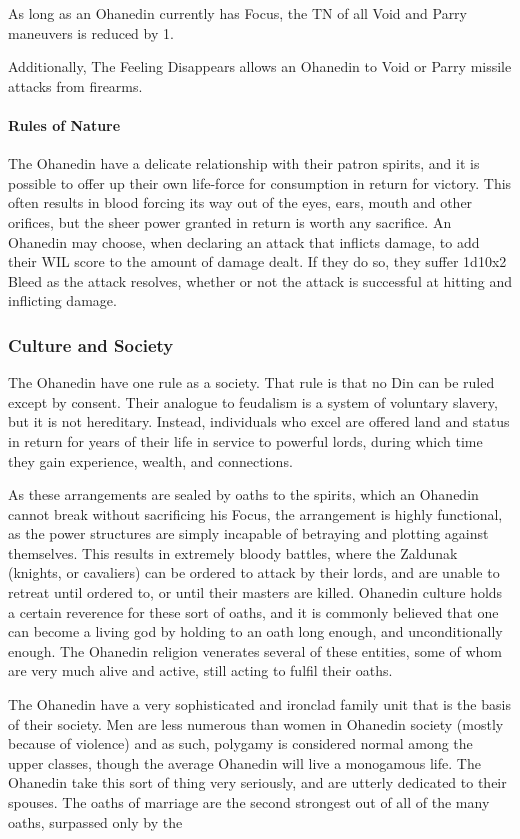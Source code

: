 \documentclass[oneside,11pt,english]{book}
\begin{document}
As long as an Ohanedin currently has Focus, the TN of all Void and Parry maneuvers is reduced by 1.

Additionally, The Feeling Disappears allows an Ohanedin to Void or Parry missile attacks from firearms. 
\paragraph{Rules of Nature}
The Ohanedin have a delicate relationship with their patron spirits, and it is possible to offer up 
their own life-force for consumption in return for victory. This often results in blood forcing its 
way out of the eyes, ears, mouth and other orifices, but the sheer power granted in return is worth 
any sacrifice. An Ohanedin may choose, when declaring an attack that inflicts damage, to add 
their WIL score to the amount of damage dealt. If they do so, they suffer 1d10x2 Bleed as the 
attack resolves, whether or not the attack is successful at hitting and inflicting damage. 
\subsubsection*{Culture and Society} 
The Ohanedin have one rule as a society. That rule is that no Din can be ruled except by consent. Their 
analogue to feudalism is a system of voluntary slavery, but it is not hereditary. Instead, individuals who 
excel are offered land and status in return for years of their life in service to powerful lords, during which 
time they gain experience, wealth, and connections. 


As these arrangements are sealed by oaths to the spirits, which an Ohanedin cannot break without 
sacrificing his Focus, the arrangement is highly functional, as the power structures are simply incapable 
of betraying and plotting against themselves. This results in extremely bloody battles, where the Zaldunak 
(knights, or cavaliers) can be ordered to attack by their lords, and are unable to retreat until ordered to, or 
until their masters are killed. Ohanedin culture holds a certain reverence for these sort of oaths, and it is 
commonly believed that one can become a living god by holding to an oath long enough, and 
unconditionally enough. The Ohanedin religion venerates several of these entities, some of whom are 
very much alive and active, still acting to fulfil their oaths. 


The Ohanedin have a very sophisticated and ironclad family unit that is the basis of their society. Men are 
less numerous than women in Ohanedin society (mostly because of violence) and as such, polygamy is 
considered normal among the upper classes, though the average Ohanedin will live a monogamous life. 
The Ohanedin take this sort of thing very seriously, and are utterly dedicated to their spouses. The oaths 
of marriage are the second strongest out of all of the many oaths, surpassed only by the 
\end{document}
